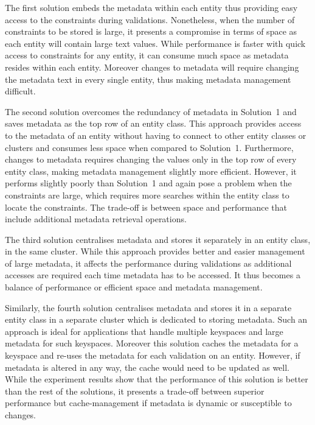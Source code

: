 The first solution embeds the metadata within each entity thus providing easy
access to the constraints during validations. Nonetheless, when the number of
constraints to be stored is large, it presents a compromise in terms of space as
each entity will contain large text values. While performance is faster with
quick access to constraints for any entity, it can consume much space as
metadata resides within each entity. Moreover changes to metadata will require
changing the metadata text in every single entity, thus making metadata management
difficult.

The second solution overcomes the redundancy of metadata in Solution~1 and saves
metadata as the top row of an entity class. This approach provides access to the
metadata of an entity without having to connect to other entity classes or
clusters and consumes less space when compared to Solution~1.  Furthermore,
changes to metadata requires changing the values only in the top row of every
entity class, making metadata management slightly more efficient. However, it
performs slightly poorly than Solution~1 and again pose a problem when the
constraints are large, which requires more searches within the entity class to
locate the constraints. The trade-off is between space and performance
 that include additional metadata retrieval operations.

The third solution centralises metadata and stores it separately in an entity
class, in the same cluster. While this approach provides better and easier
management of large metadata, it affects the performance during validations as
additional accesses are required each time metadata has to be accessed. It thus
becomes a balance of performance or efficient space and metadata management.

Similarly, the fourth solution centralises metadata and stores it in a separate
entity class in a separate cluster which is dedicated to storing metadata. Such
an approach is ideal for applications that handle multiple keyspaces and large
metadata for such keyspaces. Moreover this solution caches the metadata for a
keyspace and re-uses the metadata for each validation on an entity. However, if
metadata is altered in any way, the cache would need to be updated as well.
While the experiment results show that the performance of this solution is
better than the rest of the solutions, it presents a trade-off between superior
performance but cache-management if metadata is dynamic or susceptible to
changes.




